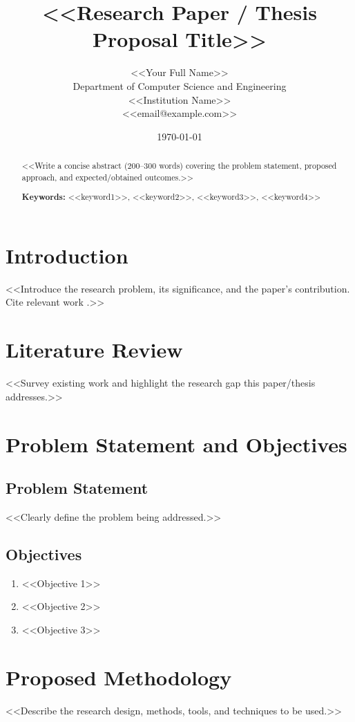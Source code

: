 \documentclass[12pt,a4paper]{article}
\title{\textbf{<<Research Paper / Thesis Proposal Title>>}}
\author{
<<Your Full Name>>\\
\small Department of Computer Science and Engineering\\
\small <<Institution Name>>\\
\small <<email@example.com>>
}
\date{\today}
\begin{document}
\maketitle

\begin{abstract}
\noindent <<Write a concise abstract (200--300 words) covering the problem statement, proposed approach, and expected/obtained outcomes.>>

\vspace{0.3cm}
\noindent \textbf{Keywords:} <<keyword1>>, <<keyword2>>, <<keyword3>>, <<keyword4>>
\end{abstract}

\section{Introduction}
<<Introduce the research problem, its significance, and the paper's contribution. Cite relevant work \citep{example2020}.>>

\section{Literature Review}
<<Survey existing work and highlight the research gap this paper/thesis addresses.>>

\section{Problem Statement and Objectives}
\subsection{Problem Statement}
<<Clearly define the problem being addressed.>>

\subsection{Objectives}
\begin{enumerate}
    \item <<Objective 1>>
    \item <<Objective 2>>
    \item <<Objective 3>>
\end{enumerate}

\section{Proposed Methodology}
<<Describe the research design, methods, tools, and techniques to be used.>>
\end{document}
